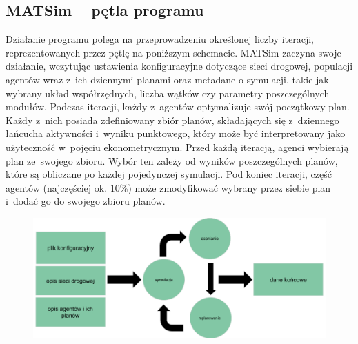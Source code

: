 \subsection{MATSim -- pętla programu}
Działanie programu polega na przeprowadzeniu określonej liczby iteracji, reprezentowanych przez pętlę na poniższym schemacie. MATSim zaczyna swoje działanie, wczytując ustawienia konfiguracyjne dotyczące sieci drogowej, populacji agentów wraz z~ich dziennymi planami oraz metadane o symulacji, takie jak wybrany układ współrzędnych, liczba wątków czy parametry poszczególnych modułów. Podczas iteracji, każdy z~agentów optymalizuje swój początkowy plan. Każdy z~nich posiada zdefiniowany zbiór planów, składających się z~dziennego łańcucha aktywności i~wyniku punktowego, który może być interpretowany jako użyteczność w~pojęciu ekonometrycznym. Przed każdą iteracją, agenci wybierają plan ze~swojego zbioru. Wybór ten zależy od wyników poszczególnych planów, które są obliczane po każdej pojedynczej symulacji. Pod koniec iteracji, część agentów (najczęściej ok. 10\%) może zmodyfikować wybrany przez siebie plan i~dodać go do swojego zbioru planów. 
    \begin{figure}[h]
        \includegraphics[width=\textwidth]{images/mopsim/matsim-workflow.png}
    \end{figure}
\newpage
